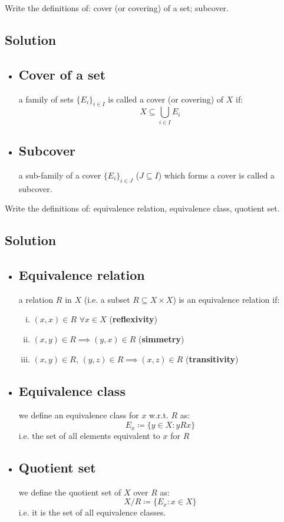 
\question
Write the definitions of: cover (or covering) of a set; subcover.

\subsection*{Solution}
\provdefs
\begin{itemize}
    \item \subsection{Cover of a set} a family of sets $\{E_i\}_{i\in I}$ is called a cover (or covering) of $X$ if:
    \[
        X \subseteq \bigcup_{i\in I} E_i    
    \]
    \item \subsection{Subcover} a sub-family of a cover $\{E_i\}_{i\in J}$ ($J\subseteq I$) which forms a cover is called a subcover.  
\end{itemize}


\question
Write the definitions of: equivalence relation, equivalence class, quotient set.

\subsection*{Solution}
\provdefs
\begin{itemize}
    \item \subsection{Equivalence relation} \label{equivrel} a relation $R$ in $X$ (i.e. a subset $R\subseteq X\times X$) is an equivalence relation if:
    \begin{enumerate}[i)]
        \item $(x,x) \in R$ $\forall x\in X$ (\textbf{reflexivity})
        \item $(x,y) \in R \implies (y,x)\in R$ (\textbf{simmetry})
        \item $(x,y) \in R, \, (y,z)\in R \implies (x,z)\in R$ (\textbf{transitivity})
    \end{enumerate}
    \item \subsection{Equivalence class} we define an equivalence class for $x$ w.r.t. $R$ as:
    \[
        E_x \coloneqq \{y\in X : yRx\}
    \]
    i.e. the set of all elements equivalent to $x$ for $R$
    \item \subsection{Quotient set} we define the quotient set of $X$ over $R$ as:
    \[
        X / R \coloneqq \{E_x: x\in X \}    
    \]
    i.e. it is the set of all equivalence classes.
\end{itemize}

